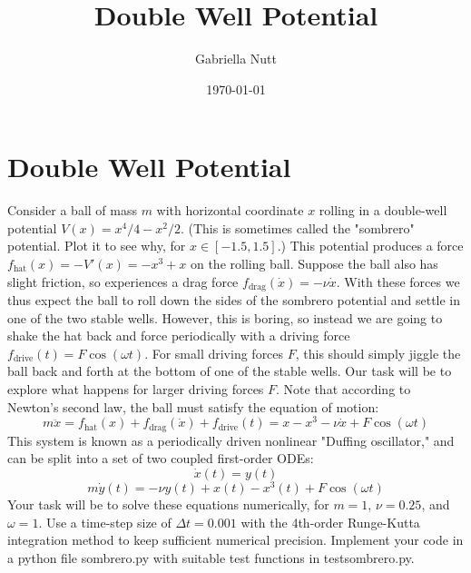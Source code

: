\documentclass[aps,pra,notitlepage,amsmath,amssymb,letterpaper,12pt]{revtex4-1}
\newenvironment{problem}[2][Problem]{\begin{trivlist}
\item[\hskip \labelsep {\bfseries #1}\hskip \labelsep {\bfseries #2.}]}{\end{trivlist}}
\begin{document}
 
\title{Double Well Potential}
\author{Gabriella Nutt}
\date{\today}

\maketitle

\section{Double Well Potential} %

\begin{problem}{1} 
Consider a ball of mass $m$ with horizontal coordinate $x$ rolling in a double-well potential $V(x) = x^4/4 - x^2/2$. (This is sometimes called the "sombrero" potential. Plot it to see why, for $x\in[-1.5,1.5]$.) This potential produces a force $f_{\text{hat}}(x) = -V'(x) = -x^3 + x$ on the rolling ball. Suppose the ball also has slight friction, so experiences a drag force $f_{\text{drag}}(\dot{x}) = -\nu \dot{x}$. With these forces we thus expect the ball to roll down the sides of the sombrero potential and settle in one of the two stable wells. However, this is boring, so instead we are going to shake the hat back and force periodically with a driving force $f_{\text{drive}}(t) = F\cos(\omega t)$. For small driving forces $F$, this should simply jiggle the ball back and forth at the bottom of one of the stable wells. Our task will be to explore what happens for larger driving forces $F$.
Note that according to Newton's second law, the ball must satisfy the equation of motion: $$m\ddot{x} = f_{\text{hat}}(x) + f_{\text{drag}}(\dot{x}) + f_{\text{drive}}(t) = x - x^3 - \nu \dot{x} + F\cos(\omega t)$$ This system is known as a periodically driven nonlinear "Duffing oscillator," and can be split into a set of two coupled first-order ODEs: $$\dot{x}(t) = y(t)$$ $$m\dot{y}(t) = -\nu y(t) + x(t) - x^3(t) + F\cos(\omega t)$$ Your task will be to solve these equations numerically, for $m=1$, $\nu = 0.25$, and $\omega = 1$. Use a time-step size of $\Delta t = 0.001$ with the 4th-order Runge-Kutta integration method to keep sufficient numerical precision. Implement your code in a python file sombrero.py with suitable test functions in testsombrero.py.
\end{problem}
 
\end{document}
